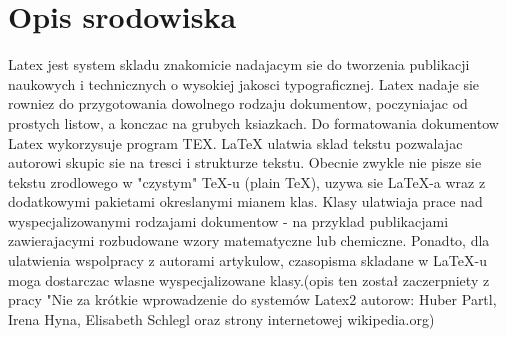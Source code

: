 \documentclass{article}
\begin{document}
\section{Opis srodowiska}
Latex jest system skladu znakomicie nadajacym sie do tworzenia publikacji naukowych i technicznych o wysokiej jakosci typograficznej. Latex nadaje sie rowniez do przygotowania dowolnego rodzaju dokumentow, poczyniajac od prostych listow, a konczac na grubych ksiazkach. Do formatowania dokumentow Latex wykorzysuje program TEX. LaTeX ulatwia sklad tekstu pozwalajac autorowi skupic sie na tresci i strukturze tekstu.
Obecnie zwykle nie pisze sie tekstu zrodlowego w "czystym" TeX-u (plain TeX), uzywa sie LaTeX-a wraz z dodatkowymi pakietami okreslanymi mianem klas. Klasy ulatwiaja prace nad wyspecjalizowanymi rodzajami dokumentow - na przyklad publikacjami zawierajacymi rozbudowane wzory matematyczne lub chemiczne. Ponadto, dla ulatwienia wspolpracy z autorami artykulow, czasopisma skladane w LaTeX-u moga dostarczac wlasne wyspecjalizowane klasy.(opis ten został zaczerpniety z pracy "Nie za krótkie wprowadzenie do systemów Latex2 autorow: Huber Partl, Irena Hyna, Elisabeth Schlegl oraz strony internetowej wikipedia.org)

\cite{Oetiker:wprowadzenie:Latex}


\end{document}
